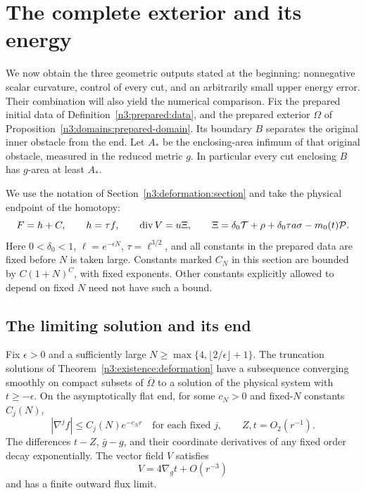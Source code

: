 \section{The complete exterior and its energy}\label{n3:limit:section}

We now obtain the three geometric outputs stated at the beginning:
nonnegative scalar curvature, control of every cut, and an arbitrarily
small upper energy error. Their combination will also yield the
numerical comparison. Fix the prepared initial data of
Definition~\ref{n3:prepared:data}, and the prepared exterior
\(\Omega\) of Proposition~\ref{n3:domains:prepared-domain}.
Its boundary \(B\) separates the original inner obstacle from the end.
Let \(A_*\) be the enclosing-area infimum of that original obstacle,
measured in the reduced metric \(g\).
In particular every cut enclosing \(B\) has \(g\)-area at least \(A_*\).

We use the notation of Section~\ref{n3:deformation:section} and take the
physical endpoint of the homotopy:
\[
 F=h+C,\qquad h=\tau f,\qquad
 \operatorname{div} V=u\Xi,\qquad
 \Xi=\delta_0\mathcal T+\rho+\delta_0\tau a\sigma-m_0(t)\mathcal P.
\]
Here \(0<\delta_0<1\), \(\ell=e^{-\epsilon N}\),
\(\tau=\ell^{3/2}\), and all constants in the prepared data are fixed
before \(N\) is taken large. Constants marked \(C_N\) in this section
are bounded by \(C(1+N)^C\), with fixed exponents. Other constants
explicitly allowed to depend on fixed \(N\) need not have such a bound.

\subsection{The limiting solution and its end}

\begin{lemma}\label{n3:limit:end}
Fix \(\epsilon>0\) and a sufficiently large
\(N\ge\max\{4,\lfloor2/\epsilon\rfloor+1\}\). The truncation solutions of
Theorem~\ref{n3:existence:deformation} have a subsequence converging
smoothly on compact subsets of \(\overline\Omega\) to a solution of
the physical system with \(t\ge-\epsilon\).
On the asymptotically flat end, for some \(c_N>0\) and fixed-\(N\)
constants \(C_j(N)\),
\[
 |\nabla^j f|\le C_j(N)e^{-c_N r}
 \quad\text{for each fixed }j,\qquad
 Z,t=O_2(r^{-1}).
\]
The differences \(t-Z\), \(\bar g-g\), and their coordinate derivatives
of any fixed order decay exponentially. The vector field \(V\)
satisfies
\begin{equation}\label{n3:limit:V-asymptote}
                    V=4\nabla_g t+O(r^{-3})
\end{equation}
and has a finite outward flux limit.
\end{lemma}

